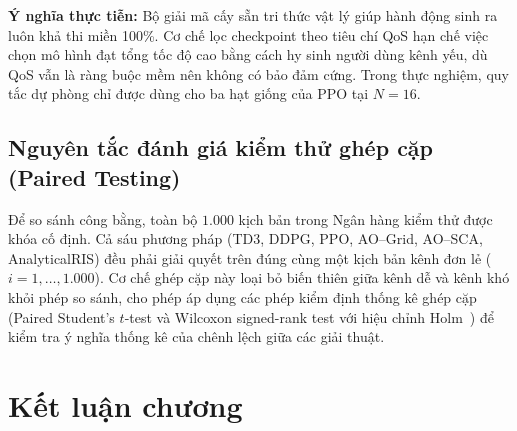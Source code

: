 \textbf{Ý nghĩa thực tiễn:} Bộ giải mã cấy sẵn tri thức vật lý giúp hành động sinh ra luôn khả thi miền 100\%. Cơ
chế lọc checkpoint theo tiêu chí QoS hạn chế việc chọn mô hình đạt tổng tốc độ cao bằng cách hy sinh người dùng
kênh yếu, dù QoS vẫn là ràng buộc mềm nên không có bảo đảm cứng. Trong thực nghiệm, quy tắc dự phòng chỉ được dùng
cho ba hạt giống của PPO tại $N = 16$.





\subsection{Nguyên tắc đánh giá kiểm thử ghép cặp (Paired Testing)}
\label{ssec:kiem-thu-ghep-cap}

Để so sánh công bằng, toàn bộ $1.000$ kịch bản trong Ngân hàng kiểm thử được khóa cố định. Cả sáu phương pháp
(TD3, DDPG, PPO, AO--Grid, AO--SCA, AnalyticalRIS) đều phải giải quyết trên đúng cùng một kịch bản kênh đơn lẻ
($i = 1, \dots, 1.000$). Cơ chế ghép cặp này loại bỏ biến thiên giữa kênh dễ và kênh khó khỏi phép so sánh, cho
phép áp dụng các phép kiểm định thống kê ghép cặp (Paired Student's $t$-test và Wilcoxon signed-rank test với hiệu
chỉnh Holm~\cite{Holm1979}) để kiểm tra ý nghĩa thống kê của chênh lệch giữa các giải thuật.

\section{Kết luận chương}
\label{sec:ket-luan-ch3}

